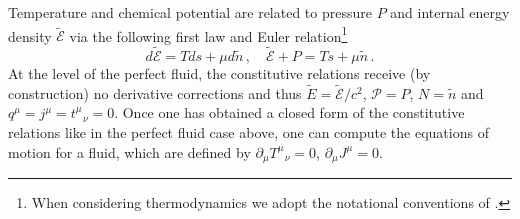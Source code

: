 \documentclass[superscriptaddress,prd,nofootinbib,preprintnumbers,longbibliography,11pt,eqsecnum]{revtex4-1}
\begin{document}
Temperature and chemical potential are related to pressure $P$ and internal energy density $\tilde{\mathcal{E}}$ via the following first law and Euler relation\footnote{When considering thermodynamics we adopt the notational conventions of \cite{deBoer:2017ing}.}
\begin{equation}
	d\tilde{\mathcal{E}}
	=
	Tds
	+
	\mu d\tilde{n}
	\,,
	\quad
	\tilde{\mathcal{E}}
	+
	P
	=
	T
	s
	+
	\mu
	\tilde{n}
	\,.
\end{equation}
At the level of the perfect fluid, the constitutive relations receive (by construction) no derivative corrections and thus $\tilde{E}=\tilde{\mathcal{E}}/c^{2}$, $\mathcal{P}=P$, $N=\tilde{n}$ and $q^{\mu}=j^{\mu}=t^{\mu}_{\;\;\,\nu}=0$.
Once one has obtained a closed form of the constitutive relations like in the perfect fluid case above, one can compute the equations of motion for a fluid, which are defined by $\partial_{\mu}T^{\mu}_{\;\;\,\nu}=0$, $\partial_{\mu}J^{\mu}=0$.
\end{document}
